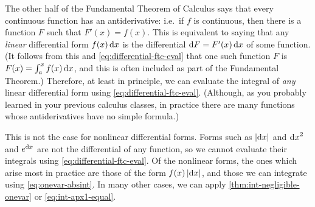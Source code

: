 The other half of the Fundamental Theorem of Calculus says that every continuous function has an antiderivative: i.e.\ if $f$ is continuous, then there is a function $F$ such that $F'(x) = f(x)$.
This is equivalent to saying that any \emph{linear} differential form $f(x)\,{\mathrm{d} x}$ is the differential $\mathrm{d} F = F'(x)\,{\mathrm{d} x}$ of some function.
(It follows from this and \cref{eq:differential-ftc-eval} that one such function $F$ is $F(x)= \int_a^x f(x)\,{\mathrm{d} x}$, and this is often included as part of the Fundamental Theorem.)
Therefore, at least in principle, we can evaluate the integral of \emph{any} linear differential form using \cref{eq:differential-ftc-eval}.
(Although, as you probably learned in your previous calculus classes, in practice there are many functions whose antiderivatives have no simple formula.)

This is not the case for nonlinear differential forms.
Forms such as $|{\mathrm{d} x}|$ and ${\mathrm{d} x}^2$ and $e^{\mathrm{d} x}$ are not the differential of any function, so we cannot evaluate their integrals using \cref{eq:differential-ftc-eval}.
Of the nonlinear forms, the ones which arise most in practice are those of the form $f(x)\,|{\mathrm{d} x}|$, and those we can integrate using \cref{eq:onevar-absint}.
In many other cases, we can apply \cref{thm:int-negligible-onevar} or \cref{eq:int-apx1-equal}.

